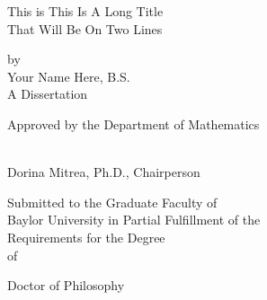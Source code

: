 \documentclass[12pt]{report} %
\newcommand{\mytitle}{This is This Is A Long Title\\ That Will Be On Two Lines} %
\newcommand{\myname}{Your Name Here} %
\newcommand{\longsignatureline}[1]{ 
        \begin{singlespacing}
        \begin{center}
        \vrule width 4.375in height 0.2mm
        \\
        \vspace{-.05in}
        #1 
        \end{center}
        \end{singlespacing}
}
\numberwithin{equation}{subsection}
\numberwithin{figure}{chapter} %
\theoremstyle{numbernote}
\theoremstyle{nonumber}
\theoremstyle{nonumbernonote}
\theoremstyle{nonote}
\begin{document}

\pagebreak


\thispagestyle{empty}
\begin{center}
    \begin{singlespacing}
    \mytitle{}\\            %
    \end{singlespacing}

    by\\
    
    \myname{}, B.S.\\ %

    A Dissertation
    
    Approved by the Department of Mathematics
    
    \longsignatureline{Dorina Mitrea, Ph.D., Chairperson} %

\begin{singlespacing}
    Submitted to the Graduate Faculty of\\
    
    Baylor University in Partial Fulfillment of the\\
    
    Requirements for the Degree\\
    
    of\\
    
\end{singlespacing}

    Doctor of Philosophy\\ %
\end{center}

\vspace{0.25in} %
\end{document}
